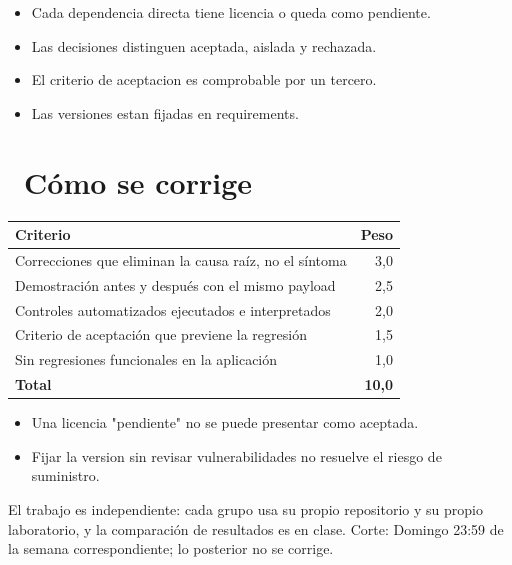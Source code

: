 \documentclass[11pt,a4paper]{article}
\newcommand{\iconotexto}[2]{\textcolor{cyanNeon}{\faIcon{#1}}~#2}
\begin{document}
\begin{itemize}[leftmargin=1.4em,itemsep=2pt,topsep=3pt]
  \item Cada dependencia directa tiene licencia o queda como pendiente.
  \item Las decisiones distinguen aceptada, aislada y rechazada.
  \item El criterio de aceptacion es comprobable por un tercero.
  \item Las versiones estan fijadas en requirements.
\end{itemize}

\section{\iconotexto{ruler-combined}{Cómo se corrige}}

\begin{tabularx}{\linewidth}{@{}X r@{}}
\toprule
Criterio & Peso\\
\midrule
Correcciones que eliminan la causa raíz, no el síntoma & 3,0 \\
Demostración antes y después con el mismo payload & 2,5 \\
Controles automatizados ejecutados e interpretados & 2,0 \\
Criterio de aceptación que previene la regresión & 1,5 \\
Sin regresiones funcionales en la aplicación & 1,0 \\
\midrule
\textbf{Total} & \textbf{10,0}\\
\bottomrule
\end{tabularx}

\begin{itemize}[leftmargin=1.4em,itemsep=2pt,topsep=3pt]
  \item Una licencia "pendiente" no se puede presentar como aceptada.
  \item Fijar la version sin revisar vulnerabilidades no resuelve el riesgo de suministro.
\end{itemize}

\begin{cajaRecuerda}El trabajo es independiente: cada grupo usa su propio repositorio y su propio laboratorio, y la comparación de resultados es en clase. Corte: Domingo 23:59 de la semana correspondiente; lo posterior no se corrige.
\end{cajaRecuerda}
\end{document}

